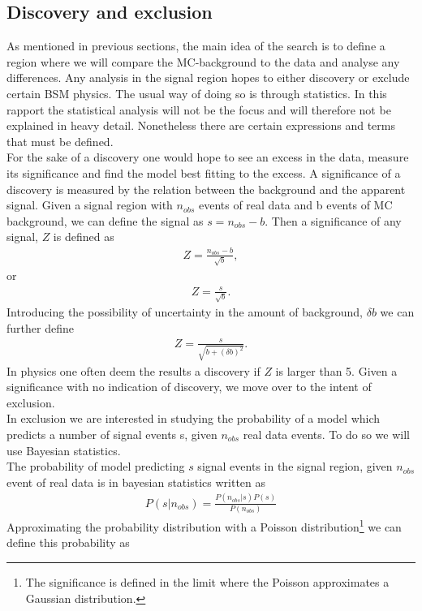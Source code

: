 \documentclass{article}
\begin{document}
\subsection{Discovery and exclusion}
As mentioned in previous sections, the main idea of the search is to define a region where we will compare the MC-background to the data and analyse any differences. Any analysis in the signal region hopes to either discovery or exclude certain BSM physics. The usual way of doing so is through statistics. In this rapport the statistical analysis will not be the focus and will therefore not be explained in heavy detail. Nonetheless there are certain expressions and terms that must be defined.
\\
For the sake of a discovery one would hope to see an excess in the data, measure its significance and find the model best fitting to the excess. A significance of a discovery is measured by the relation between the background and the apparent signal. Given a signal region with $n_{obs}$ events of real data and b events of MC background, we can define the signal as $s = n_{obs}-b$. Then a significance of any signal, $Z$ is defined as 
\begin{align}
    Z = \frac{n_{obs}-b}{\sqrt{b}},
\end{align}
or 
\begin{align}
    Z = \frac{s}{\sqrt{b}}.
\end{align}
Introducing the possibility of uncertainty in the amount of background, $\delta b$ we can further define
\begin{align}\label{eq:Z}
    Z = \frac{s}{\sqrt{b+(\delta b)^2}}.
\end{align}
In physics one often deem the results a discovery if $Z$ is larger than 5.  Given a significance with no indication of discovery, we move over to the intent of exclusion.\\
In exclusion we are interested in studying the probability of a model which predicts a number of signal events s, given $n_{obs}$ real data events. To do so we will use Bayesian statistics.
\\
The probability of model predicting $s$ signal events in the signal region, given $n_{obs}$ event of real data is in bayesian statistics written as
\begin{align}\label{eq:bays}
    P(s|n_{obs}) = \frac{P(n_{obs}|s)P(s)}{P(n_{obs})}
\end{align}
Approximating the probability distribution with a Poisson distribution\footnote{The significance is defined in the limit where the Poisson approximates a Gaussian distribution.} we can define this probability as
\end{document}
